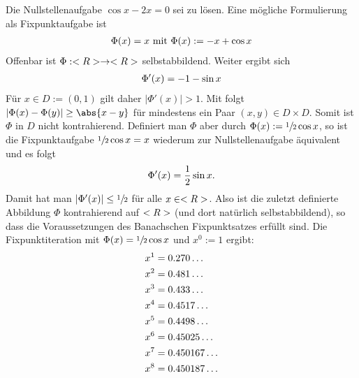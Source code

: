 \begin{example}
	Die Nullstellenaufgabe $\cos x - 2x = 0$ sei zu lösen. Eine mögliche Formulierung als Fixpunktaufgabe ist
	\begin{align}
	\Phi(x) = x \text{   mit  } \Phi(x) := -x + \cos x \notag
	\end{align}
	Offenbar ist $\Phi: <R> \to <R>$ selbstabbildend. Weiter ergibt sich
	\begin{align}
	\Phi'(x) = -1 - \sin x \notag
	\end{align}
	Für $x \in D := (0,1)$ gilt daher $\vert \Phi' (x)\vert > 1$. Mit  folgt $\vert \Phi(x) - \Phi(y)\vert \ge \abs{x-y}$ für mindestens ein Paar $(x,y) \in D \times D$. Somit ist $\Phi$ in $D$ nicht kontrahierend.
	Definiert man $\Phi$ aber durch $\Phi(x) := \sfrac{1}{2}\cos x$, so ist die Fixpunktaufgabe $\sfrac{1}{2}\cos x = x$ wiederum zur Nullstellenaufgabe äquivalent und es folgt
	\begin{align}
	\Phi'(x) = \frac{1}{2}\sin x. \notag
	\end{align} 
	Damit hat man $\vert \Phi'(x)\vert \le \sfrac{1}{2}$ für alle $x \in <R>$. Also ist die zuletzt definierte Abbildung $\Phi$ kontrahierend auf $<R>$ (und dort natürlich selbstabbildend), so dass die Voraussetzungen des Banachschen Fixpunktsatzes erfüllt sind. Die Fixpunktiteration mit $\Phi(x) = \sfrac{1}{2}\cos x$ und $x^0 := 1$ ergibt:
	\begin{align}
		x^1 &= 0.270\dots \notag \\
		x^2 &= 0.481\dots \notag \\
		x^3 &= 0.433\dots \notag \\
		x^4 &= 0.4517\dots \notag \\
		x^5 &= 0.4498 \dots \notag \\
		x^6 &= 0.45025\dots \notag \\
		x^7 &= 0.450167\dots \notag \\
		x^8 &= 0.450187\dots \notag
	\end{align}
	\begin{center}
	\end{center}
\end{example}

